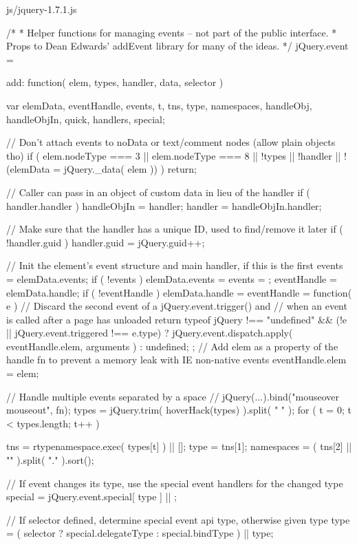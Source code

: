 \documentclass{article}
\begin{document}
\begin{chunk}{js/jquery-1.7.1.js}
{/*
 * Helper functions for managing events -- not part of the public interface.
 * Props to Dean Edwards' addEvent library for many of the ideas.
 */
jQuery.event = {

	add: function( elem, types, handler, data, selector ) {

		var elemData, eventHandle, events,
			t, tns, type, namespaces, handleObj,
			handleObjIn, quick, handlers, special;

		// Don't attach events to noData or text/comment nodes (allow plain objects tho)
		if ( elem.nodeType === 3 || elem.nodeType === 8 || !types || !handler || !(elemData = jQuery._data( elem )) ) {
			return;
		}

		// Caller can pass in an object of custom data in lieu of the handler
		if ( handler.handler ) {
			handleObjIn = handler;
			handler = handleObjIn.handler;
		}

		// Make sure that the handler has a unique ID, used to find/remove it later
		if ( !handler.guid ) {
			handler.guid = jQuery.guid++;
		}

		// Init the element's event structure and main handler, if this is the first
		events = elemData.events;
		if ( !events ) {
			elemData.events = events = {};
		}
		eventHandle = elemData.handle;
		if ( !eventHandle ) {
			elemData.handle = eventHandle = function( e ) {
				// Discard the second event of a jQuery.event.trigger() and
				// when an event is called after a page has unloaded
				return typeof jQuery !== "undefined" && (!e || jQuery.event.triggered !== e.type) ?
					jQuery.event.dispatch.apply( eventHandle.elem, arguments ) :
					undefined;
			};
			// Add elem as a property of the handle fn to prevent a memory leak with IE non-native events
			eventHandle.elem = elem;
		}

		// Handle multiple events separated by a space
		// jQuery(...).bind("mouseover mouseout", fn);
		types = jQuery.trim( hoverHack(types) ).split( " " );
		for ( t = 0; t < types.length; t++ ) {

			tns = rtypenamespace.exec( types[t] ) || [];
			type = tns[1];
			namespaces = ( tns[2] || "" ).split( "." ).sort();

			// If event changes its type, use the special event handlers for the changed type
			special = jQuery.event.special[ type ] || {};

			// If selector defined, determine special event api type, otherwise given type
			type = ( selector ? special.delegateType : special.bindType ) || type;

}}}}
\end{chunk}
\end{document}
